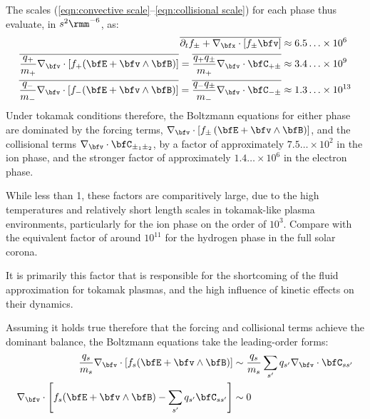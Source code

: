     The scales (\ref{eqn:convective scale}–\ref{eqn:collisional scale}) for each phase thus evaluate, in $s^{2}\rmm^{- 6}$, as:
    \begin{align}
        \overline{\partial_{t}f_{\pm} + \nabla_{\bfx}\cdot[f_{\pm}\bfv]}  &\approx  6.5\ldots\times 10^{6}  \\
        \overline{\frac{q_{+}}{m_{+}}\nabla_{\bfv}\cdot[f_{+}(\bfE + \bfv\wedge\bfB)]}  =  \overline{\frac{q_{+}q_{\pm}}{m_{+}}\nabla_{\bfv}\cdot\bfC_{+\pm}}  &\approx  3.4\ldots\times 10^{9}  \\
        \overline{\frac{q_{-}}{m_{-}}\nabla_{\bfv}\cdot[f_{-}(\bfE + \bfv\wedge\bfB)]}  =  \overline{\frac{q_{-}q_{\pm}}{m_{-}}\nabla_{\bfv}\cdot\bfC_{-\pm}}  &\approx  1.3\ldots\times 10^{13}
    \end{align}
    Under tokamak conditions therefore, the Boltzmann equations for either phase are dominated by the forcing terms, $\nabla_{\bfv}\cdot[f_{\pm}\left(\bfE + \bfv\wedge\bfB\right)]$, and the collisional terms $\nabla_{\bfv}\cdot\bfC_{\pm_{1}\pm_{2}}$, by a factor of approximately $7.5\ldots\times 10^{2}$ in the ion phase, and the stronger factor of approximately $1.4\ldots\times 10^{6}$ in the electron phase. 

    \begin{remark}
        While less than 1, these factors are comparitively large, due to the high temperatures and relatively short length scales in tokamak-like plasma environments, particularly for the ion phase on the order of $10^{3}$. Compare with the equivalent factor of around $10^{11}$ for the hydrogen phase in the full solar corona.

        It is primarily this factor that is responsible for the shortcoming of the fluid approximation for tokamak plasmas, and the high influence of kinetic effects on their dynamics.
    \end{remark}


    Assuming it holds true therefore that the forcing and collisional terms achieve the dominant balance, the Boltzmann equations take the leading-order forms:
    \begin{align}\label{eqn:leading-order Boltzmann equation}
        \frac{q_{s}}{m_{s}}\nabla_{\bfv}\cdot[f_{s}(\bfE + \bfv\wedge\bfB)]  &\sim  \frac{q_{s}}{m_{s}}\sum_{s'}q_{s'}\nabla_{\bfv}\cdot\bfC_{ss'}  \\
        \nabla_{\bfv}\cdot\left[f_{s}(\bfE + \bfv\wedge\bfB) - \sum_{s'}q_{s'}\bfC_{ss'}\right]  &\sim  0
    \end{align}
    